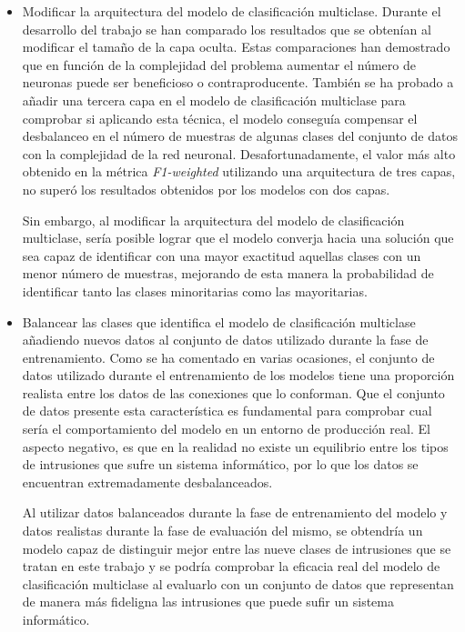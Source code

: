 \begin{itemize}
	\item Modificar la arquitectura del modelo de clasificación multiclase. Durante el desarrollo del trabajo se han comparado los resultados que se obtenían al modificar el tamaño de la capa oculta. Estas comparaciones han demostrado que en función de la complejidad del problema aumentar el número de neuronas puede ser beneficioso o contraproducente. También se ha probado a añadir una tercera capa en el modelo de clasificación multiclase para comprobar si aplicando esta técnica, el modelo conseguía compensar el desbalanceo en el número de muestras de algunas clases del conjunto de datos con la complejidad de la red neuronal. Desafortunadamente, el valor más alto obtenido en la métrica \textit{F1-weighted} utilizando una arquitectura de tres capas, no superó los resultados obtenidos por los modelos con dos capas.
	
	Sin embargo, al modificar la arquitectura del modelo de clasificación multiclase, sería posible lograr que el modelo converja hacia una solución que sea capaz de identificar con una mayor exactitud aquellas clases con un menor número de muestras, mejorando de esta manera la probabilidad de identificar tanto las clases minoritarias como las mayoritarias.
	
	\item Balancear las clases que identifica el modelo de clasificación multiclase añadiendo nuevos datos al conjunto de datos utilizado durante la fase de entrenamiento. Como se ha comentado en varias ocasiones, el conjunto de datos utilizado durante el entrenamiento de los modelos tiene una proporción realista entre los datos de las conexiones que lo conforman. Que el conjunto de datos presente esta característica es fundamental para comprobar cual sería el comportamiento del modelo en un entorno de producción real. El aspecto negativo, es que en la realidad no existe un equilibrio entre los tipos de intrusiones que sufre un sistema informático, por lo que los datos se encuentran extremadamente desbalanceados.
	
	Al utilizar datos balanceados durante la fase de entrenamiento del modelo y datos realistas durante la fase de evaluación del mismo, se obtendría un modelo capaz de distinguir mejor entre las nueve clases de intrusiones que se tratan en este trabajo y se podría comprobar la eficacia real del modelo de clasificación multiclase al evaluarlo con un conjunto de datos que representan de manera más fideligna las intrusiones que puede sufir un sistema informático.
	

\end{itemize}
